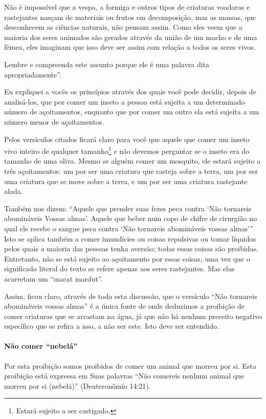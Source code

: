 Não é impossível que a vespa, a formiga e outros tipos de criaturas
voadoras e rastejantes nasçam de materiais ou frutos em decomposição,
mas as massas, que desconhecem as ciências naturais, não pensam assim.
Como eles veem que a maioria dos seres animados são gerados através da
união de um macho e de uma fêmea, eles imaginam que isso deve ser assim
com relação a todos os seres vivos.

Lembre e compreenda este assunto porque ele é uma palavra dita
apropriadamente''.

Eu expliquei a vocês os princípios através dos quais você pode decidir,
depois de analisá-los, que por comer um inseto a pessoa está sujeita a
um determinado número de açoitamentos, enquanto que por comer um outro
ela está sujeita a um número menor de açoitamentos.

Pelos versículos citados ficará claro para você que aquele que comer um
inseto vivo inteiro de qualquer tamanho\footnote{Estará sujeito a ser castigado.} e não
devemos perguntar se o inseto era do tamanho de uma oliva. Mesmo se
alguém comer um mosquito, ele estará sujeito a três açoitamentos: um
por ser uma criatura que rasteja sobre a terra, um por ser uma criatura
que se move sobre a terra, e um por ser uma criatura rastejante alada.

Também nos dizem: ``Aquele que prender suas fezes peca contra `Não
tornareis abomináveis Vossas almas'. Aquele que beber num copo de chifre
de cirurgião no qual ele recebe o sangue peca contra `Não tornareis
abomináveis vossas almas''' Isto se aplica também a comer imundícies ou
coisas repulsivas ou tomar líquidos pelos quais a maioria das pessoas
tenha aversão; todas essas coisas são proibidas. Entretanto, não se está
sujeito ao açoitamento por essas coisas, uma vez que o significado
literal do texto se refere apenas aos seres rastejantes. Mas elas
acarretam um ``macat mardut''.

Assim, ficou claro, através de toda esta discussão, que o versículo
``Não tornareis abomináveis vossas almas'' é a única fonte de onde
deduzimos a proibição de comer criaturas que se arrastam na água, já que
não há nenhum preceito negativo específico que se refira a isso, a não
ser este. Isto deve ser entendido.

\paragraph{Não comer ``nebelá''}

Por esta proibição somos proibidos de comer um animal que morreu por
si. Esta proibição está expressa em Suas palavras ``Não comereis nenhum
animal que morreu por si (nebelá)'' (Deuteronômio 14:21).

